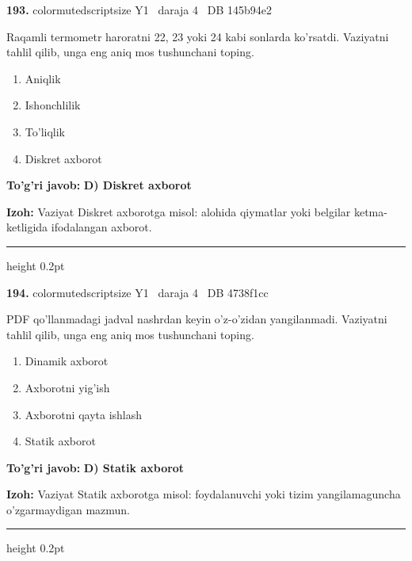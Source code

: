 \documentclass[10pt,a4paper,oneside]{article}
\begin{document}
\noindent\textbf{\color{ink}193.}  {color{muted}scriptsize Y1 \textbullet\ daraja 4 \textbullet\ DB 145b94e2}
\par
Raqamli termometr haroratni 22, 23 yoki 24 kabi sonlarda ko'rsatdi. Vaziyatni tahlil qilib, unga eng aniq mos tushunchani toping.
\begin{enumerate}[label=\Alph*),leftmargin=9mm]
\item Aniqlik
\item Ishonchlilik
\item To'liqlik
\item Diskret axborot
\end{enumerate}
\begin{tcolorbox}[enhanced,breakable,colback=teal!4,colframe=teal!50!black,boxrule=0.5pt,arc=1.1mm,left=3mm,right=3mm,top=1.7mm,bottom=1.7mm,before skip=2mm,after skip=2mm]
\textbf{\color{teal}To'g'ri javob:} \textbf{D) Diskret axborot}
\par\smallskip
\textbf{Izoh:} Vaziyat Diskret axborotga misol: alohida qiymatlar yoki belgilar ketma-ketligida ifodalangan axborot.
\end{tcolorbox}
\vspace{2mm}\hrule height 0.2pt \vspace{3mm}

\noindent\textbf{\color{ink}194.}  {color{muted}scriptsize Y1 \textbullet\ daraja 4 \textbullet\ DB 4738f1cc}
\par
PDF qo'llanmadagi jadval nashrdan keyin o'z-o'zidan yangilanmadi. Vaziyatni tahlil qilib, unga eng aniq mos tushunchani toping.
\begin{enumerate}[label=\Alph*),leftmargin=9mm]
\item Dinamik axborot
\item Axborotni yig'ish
\item Axborotni qayta ishlash
\item Statik axborot
\end{enumerate}
\begin{tcolorbox}[enhanced,breakable,colback=teal!4,colframe=teal!50!black,boxrule=0.5pt,arc=1.1mm,left=3mm,right=3mm,top=1.7mm,bottom=1.7mm,before skip=2mm,after skip=2mm]
\textbf{\color{teal}To'g'ri javob:} \textbf{D) Statik axborot}
\par\smallskip
\textbf{Izoh:} Vaziyat Statik axborotga misol: foydalanuvchi yoki tizim yangilamaguncha o'zgarmaydigan mazmun.
\end{tcolorbox}
\vspace{2mm}\hrule height 0.2pt \vspace{3mm}
\end{document}
